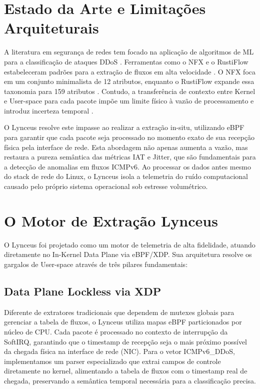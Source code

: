 \documentclass[12pt]{article}
\begin{document}
\section{Estado da Arte e Limitações Arquiteturais}
A literatura em segurança de redes tem focado na aplicação de algoritmos de ML para a classificação de ataques DDoS \cite{sharafaldin_toward_2018}. Ferramentas como o NFX e o RustiFlow estabeleceram padrões para a extração de fluxos em alta velocidade \cite{shafi_ntlflowlyzer_2025}. O NFX foca em um conjunto minimalista de 12 atributos, enquanto o RustiFlow expande essa taxonomia para 159 atributos \cite{shafi_toward_2024}. Contudo, a transferência de contexto entre Kernel e User-space para cada pacote impõe um limite físico à vazão de processamento e introduz incerteza temporal \cite{lashkari_cicflowmeter-v40_2018}.

O Lynceus resolve este impasse ao realizar a extração in-situ, utilizando eBPF para garantir que cada pacote seja processado no momento exato de sua recepção física pela interface de rede. Esta abordagem não apenas aumenta a vazão, mas restaura a pureza semântica das métricas IAT e Jitter, que são fundamentais para a detecção de anomalias em fluxos ICMPv6. Ao processar os dados antes mesmo do stack de rede do Linux, o Lynceus isola a telemetria do ruído computacional causado pelo próprio sistema operacional sob estresse volumétrico.

\section{O Motor de Extração Lynceus}
O Lynceus foi projetado como um motor de telemetria de alta fidelidade, atuando diretamente no In-Kernel Data Plane via eBPF/XDP. Sua arquitetura resolve os gargalos de User-space através de três pilares fundamentais:

\subsection{Data Plane Lockless via XDP}
Diferente de extratores tradicionais que dependem de mutexes globais para gerenciar a tabela de fluxos, o Lynceus utiliza mapas eBPF particionados por núcleo de CPU. Cada pacote é processado no contexto de interrupção da SoftIRQ, garantindo que o timestamp de recepção seja o mais próximo possível da chegada física na interface de rede (NIC). Para o vetor ICMPv6\_DDoS, implementamos um parser especializado que extrai campos de controle diretamente no kernel, alimentando a tabela de fluxos com o timestamp real de chegada, preservando a semântica temporal necessária para a classificação precisa.
\end{document}
